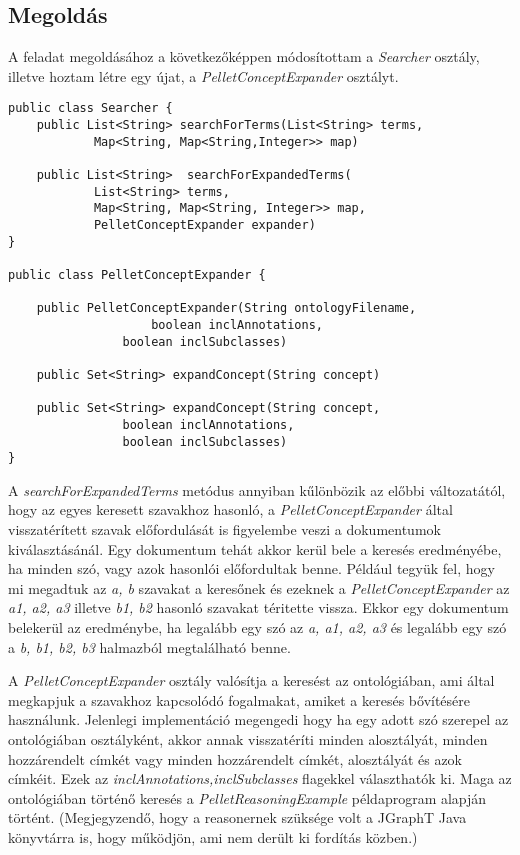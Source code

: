 \subsection{Megoldás}
A feladat megoldásához a következőképpen módosítottam a \emph{Searcher} osztály, illetve hoztam létre egy újat, a \emph{PelletConceptExpander} osztályt.

\begin{lstlisting}[frame=single,float=!ht]
public class Searcher {
	public List<String> searchForTerms(List<String> terms,
			Map<String, Map<String,Integer>> map)

	public List<String>  searchForExpandedTerms(
			List<String> terms, 
			Map<String, Map<String, Integer>> map, 
			PelletConceptExpander expander)
}

public class PelletConceptExpander {

	public PelletConceptExpander(String ontologyFilename, 
      				boolean inclAnnotations, 
				boolean inclSubclasses) 	

	public Set<String> expandConcept(String concept)
	
	public Set<String> expandConcept(String concept, 
				boolean inclAnnotations, 
				boolean inclSubclasses)
}
\end{lstlisting}

A \emph{searchForExpandedTerms} metódus annyiban kűlönbözik az előbbi változatától, hogy az egyes keresett szavakhoz hasonló, a \emph{PelletConceptExpander} által visszatérített szavak előfordulását is figyelembe veszi a dokumentumok kiválasztásánál. Egy dokumentum tehát akkor kerül bele a keresés eredményébe, ha minden szó, vagy azok hasonlói előfordultak benne. Például tegyük fel, hogy mi megadtuk az \emph{a, b} szavakat a keresőnek és ezeknek a \emph{PelletConceptExpander} az \emph{a1, a2, a3} illetve \emph{b1, b2} hasonló szavakat téritette vissza. Ekkor egy dokumentum belekerül az eredménybe, ha legalább egy szó az \emph{a, a1, a2, a3} és legalább egy szó a \emph{b, b1, b2, b3} halmazból megtalálható benne.

A \emph{PelletConceptExpander} osztály valósítja a keresést az ontológiában, ami által megkapjuk a szavakhoz kapcsolódó fogalmakat, amiket a keresés bővítésére használunk. Jelenlegi implementáció megengedi hogy ha egy adott szó szerepel az ontológiában osztályként, akkor annak visszatéríti minden alosztályát, minden hozzárendelt címkét vagy minden hozzárendelt címkét, alosztályát és azok címkéit. Ezek az \emph{inclAnnotations,inclSubclasses} flagekkel választhatók ki. Maga az ontológiában történő keresés a \emph{PelletReasoningExample} példaprogram alapján történt. (Megjegyzendő, hogy a reasonernek szüksége volt a JGraphT Java könyvtárra is, hogy működjön, ami nem derült ki fordítás közben.)
